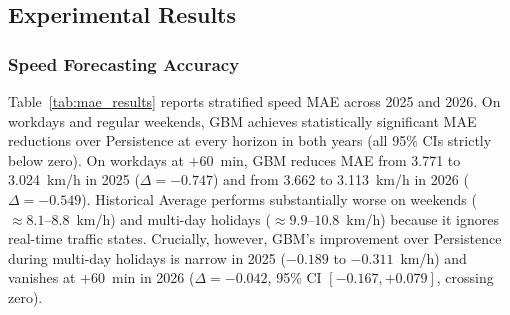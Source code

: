 \documentclass[conference]{IEEEtran}
\begin{document}
\subsection{Experimental Results}

\subsubsection{Speed Forecasting Accuracy}
Table~\ref{tab:mae_results} reports stratified speed MAE across 2025 and 2026. On workdays and regular weekends, GBM achieves statistically significant MAE reductions over Persistence at every horizon in both years (all 95\% CIs strictly below zero). On workdays at $+60$~min, GBM reduces MAE from 3.771 to 3.024~km/h in 2025 ($\Delta = -0.747$) and from 3.662 to 3.113~km/h in 2026 ($\Delta = -0.549$). Historical Average performs substantially worse on weekends ($\approx 8.1$--$8.8$~km/h) and multi-day holidays ($\approx 9.9$--$10.8$~km/h) because it ignores real-time traffic states. Crucially, however, GBM's improvement over Persistence during multi-day holidays is narrow in 2025 ($-0.189$ to $-0.311$~km/h) and vanishes at $+60$~min in 2026 ($\Delta = -0.042$, 95\% CI $[-0.167, +0.079]$, crossing zero).
\end{document}
